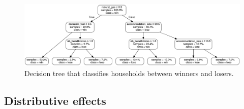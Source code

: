 \documentclass[11pt]{article}
\begin{document}
\begin{appendices}


\begin{figure}[H]
\centering
\includegraphics[width=\columnwidth]{Images/decision_tree_wo_values_wo_color.png}
\caption{Decision tree that classifies households between winners and losers.}
\label{fig:tree}
\end{figure}


\subsection{Distributive effects \label{subsec:app_distributive}}


\end{appendices}
\end{document}

